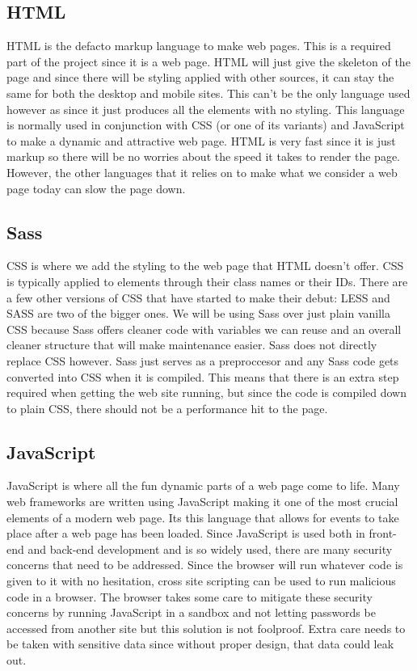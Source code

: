 \documentclass[onecolumn, draftclsnofoot,10pt, compsoc]{IEEEtran}
\begin{document}
\subsection{HTML}
HTML is the defacto markup language to make web pages. \cite{7}
This is a required part of the project since it is a web page.
HTML will just give the skeleton of the page and since there will be styling applied with other sources, it can stay the same for both the desktop and mobile sites. 
This can't be the only language used however as since it just produces all the elements with no styling.
This language is normally used in conjunction with CSS (or one of its variants) and JavaScript to make a dynamic and attractive web page. \cite{7}
HTML is very fast since it is just markup so there will be no worries about the speed it takes to render the page.
However, the other languages that it relies on to make what we consider a web page today can slow the page down.
\subsection{Sass}
CSS is where we add the styling to the web page that HTML doesn't offer.
CSS is typically applied to elements through their class names or their IDs.
There are a few other versions of CSS that have started to make their debut: LESS and SASS are two of the bigger ones.
We will be using Sass over just plain vanilla CSS because Sass offers cleaner code with variables we can reuse and an overall cleaner structure that will make maintenance easier. \cite{8}
Sass does not directly replace CSS however. 
Sass just serves as a preproccesor and any Sass code gets converted into CSS when it is compiled. \cite{8}
This means that there is an extra step required when getting the web site running, but since the code is compiled down to plain CSS, there should not be a performance hit to the page.
\subsection{JavaScript}
JavaScript is where all the fun dynamic parts of a web page come to life.
Many web frameworks are written using JavaScript making it one of the most crucial elements of a modern web page.
Its this language that allows for events to take place after a web page has been loaded.
Since JavaScript is used both in front-end and back-end development and is so widely used, there are many security concerns that need to be addressed.
Since the browser will run whatever code is given to it with no hesitation, cross site scripting can be used to run malicious code in a browser. \cite{9}
The browser takes some care to mitigate these security concerns by running JavaScript in a sandbox and not letting passwords be accessed from another site but this solution is not foolproof. \cite{9}
Extra care needs to be taken with sensitive data since without proper design, that data could leak out.
\end{document}
